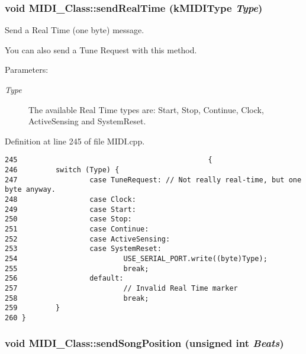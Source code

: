 \hypertarget{class_m_i_d_i___class_e9086dd31c41ea773925a069dbd0080b}{
\subsubsection[{sendRealTime}]{\setlength{\rightskip}{0pt plus 5cm}void MIDI\_\-Class::sendRealTime ({\bf kMIDIType} {\em Type})}}
\label{class_m_i_d_i___class_e9086dd31c41ea773925a069dbd0080b}


Send a Real Time (one byte) message. \par
 You can also send a Tune Request with this method. \begin{Desc}
\item[Parameters:]
\begin{description}
\item[{\em Type}]The available Real Time types are: Start, Stop, Continue, Clock, ActiveSensing and SystemReset. \end{description}
\end{Desc}


Definition at line 245 of file MIDI.cpp.

\begin{Code}\begin{verbatim}245                                             {
246         switch (Type) {
247                 case TuneRequest: // Not really real-time, but one byte anyway.
248                 case Clock:
249                 case Start:
250                 case Stop:      
251                 case Continue:
252                 case ActiveSensing:
253                 case SystemReset:
254                         USE_SERIAL_PORT.write((byte)Type);
255                         break;
256                 default:
257                         // Invalid Real Time marker
258                         break;
259         }
260 }
\end{verbatim}
\end{Code}


\hypertarget{class_m_i_d_i___class_0b9a6c3437016b8dc9678d6c43ca693f}{
\subsubsection[{sendSongPosition}]{\setlength{\rightskip}{0pt plus 5cm}void MIDI\_\-Class::sendSongPosition (unsigned int {\em Beats})}}
\label{class_m_i_d_i___class_0b9a6c3437016b8dc9678d6c43ca693f}


